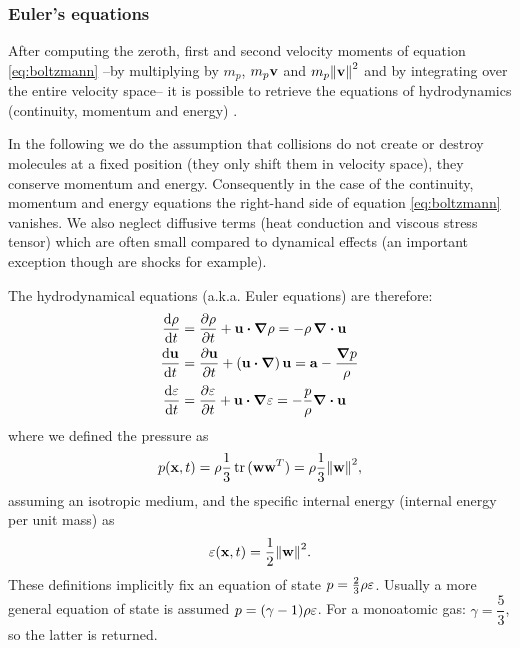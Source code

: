 \subsubsection{Euler's equations}
After computing the zeroth, first and second velocity moments of equation \eqref{eq:boltzmann} --by multiplying by $m_p$, $m_p\boldsymbol{\mathbf{v}}$ and $m_p\norm{\boldsymbol{\mathbf{v}}}^2$ and by integrating over the entire velocity space-- it is possible to retrieve the equations of hydrodynamics (continuity, momentum and energy) \citep[][and \cite{Vandenbroucke2016} for an extended derivation]{Huang1987}.

In the following we do the assumption that collisions do not create or destroy molecules at a fixed position (they only shift them in velocity space), they conserve momentum and energy.
Consequently in the case of the continuity, momentum and energy equations the right-hand side of equation \eqref{eq:boltzmann} vanishes.
We also neglect diffusive terms (heat conduction and viscous stress tensor) which are often small compared to dynamical effects (an important exception though are shocks for example).

The hydrodynamical equations (a.k.a. Euler equations) are therefore: 
\begin{align}
\label{eq:euler}
 \dv{\rho}{t} &= \pdv{\rho}{t} + \vect u \vdot \grad \rho = - \rho \,\div \vect u \nonumber\\
 \dv{\vect u}{t} &= \pdv{\vect u}{t} + \left(\vect u \vdot \grad\right) \vect u  = \vect a - \frac{\grad p}{\rho}\\
 \dv{\energy}{t} &= \pdv{\energy}{t} + \vect u \vdot \grad \energy = - \frac{p}{\rho} \div \vect u \nonumber%
\end{align}
where we defined the pressure as $$p(\vect x, t) = \rho \dfrac 1 3 \trace{(\vect w \vect w^T)} = \rho \dfrac 1 3 \norm{\vect w}^2,$$ assuming an isotropic medium, and the specific internal energy (internal energy per unit mass) as $$\varepsilon(\boldsymbol{\mathbf{x}}, t)=\dfrac 1 2 \norm{\boldsymbol{\mathbf{w}}}^2.$$ %
These definitions implicitly fix an equation of state $p = \frac 2 3 \rho \varepsilon$.
Usually a more general equation of state is assumed $p = (\gamma - 1) \rho \varepsilon$.
For a monoatomic gas: $\gamma = \dfrac{5}{3}$, so the latter is returned.

